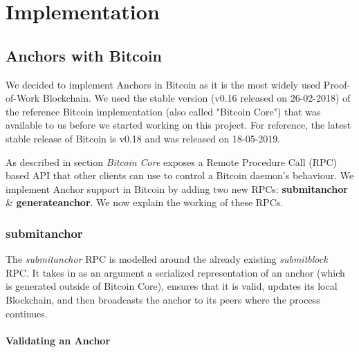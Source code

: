 


\chapter{Implementation} \label{ch-impl}


\section{Anchors with Bitcoin} \label{impl-anchors}

We decided to implement Anchors in Bitcoin as it is the most widely used Proof-of-Work Blockchain. We used the stable version (v0.16 released on 26-02-2018) of the reference Bitcoin implementation (also called "Bitcoin Core") that was available to us before we started working on this project. For reference, the latest stable release of Bitcoin is v0.18 and was released on 18-05-2019. 

As described in section  \textit{Bitcoin Core} exposes a Remote Procedure Call (RPC) based API that other clients can use to control a Bitcoin daemon's behaviour. We implement Anchor support in Bitcoin by adding two new RPCs: \textbf{submitanchor} \& \textbf{generateanchor}. We now explain the working of these RPCs.


\subsection{submitanchor} \label{impl-submitanchor}

The \textit{submitanchor} RPC is modelled around the already existing \textit{submitblock} RPC. 
It takes in as an argument a serialized representation of an anchor (which is generated outside of Bitcoin Core), ensures that it is valid, updates its local Blockchain, and then broadcasts the anchor to its peers where the process continues.

\subsubsection{Validating an Anchor}

